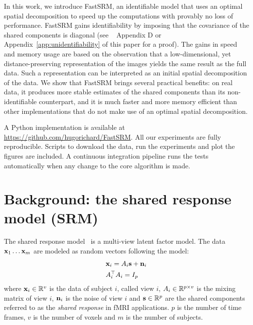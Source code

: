\documentclass{article}
\begin{document}
In this work, we introduce FastSRM, an identifiable model that uses an optimal
spatial decomposition to speed up the computations with provably no loss of
performance.
%
FastSRM gains identifiability by imposing that the covariance of the shared
components is diagonal (see ~\cite{richard2020modeling} Appendix D or Appendix~\ref{app:unidentifiability} of this paper for a proof).
%
The gains in speed and memory usage are based on the observation that a low-dimensional, yet distance-preserving
representation of the images yields the same result as the full data.
%
Such a representation can be interpreted as an initial spatial  decomposition of the data.
%
We show that FastSRM brings several practical benefits: on real data, it produces more stable
estimates of the shared components than its non-identifiable counterpart, and 
 it is much faster and more memory
efficient than other implementations that do not make use of an optimal spatial decomposition.


A Python implementation is available at
\url{https://github.com/hugorichard/FastSRM}.
%
All our experiments are fully reproducible.
%
Scripts to download the data, run the experiments and plot the figures are
included.
%
A continuous integration pipeline runs the tests
automatically when any change to the core algorithm is made.
%


\section{Background: the shared response model (SRM)}
\label{sec:srm:review}
The shared response model~\cite{chen2015reduced} is a multi-view latent factor
model.
%
The data $\mathbf{x}_1 \dots \mathbf{x}_m$ are modeled as random vectors following the model:
\begin{align}
 &\mathbf{x}_i = A_i \mathbf{s} + \mathbf{n}_i \\
  &A_i^{\top}A_i = I_p
  \label{eq:model:srm}
\end{align}
where $\mathbf{x}_i \in \mathbb{R}^v$ is the data of subject $i$, called view $i$, $A_i \in \mathbb{R}^{p \times v}$ is the
mixing matrix of view $i$, $\mathbf{n}_i$ is the noise of view $i$ and $\mathbf{s} \in \mathbb{R}^p$ are the
shared components referred to as the \emph{shared response} in fMRI
applications.
%
$p$ is the number of time frames, $v$ is the number of voxels and $m$
is the number of subjects.
\end{document}
